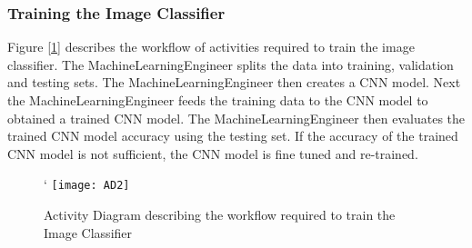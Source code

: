 \subsubsection{Training the Image Classifier}

Figure [\ref{fig:AD2}] describes the workflow of activities required to train the image classifier. The MachineLearningEngineer splits the data into training, validation and testing sets. The MachineLearningEngineer then creates a CNN model. Next the MachineLearningEngineer feeds the training data to the CNN model to obtained a trained CNN model. The MachineLearningEngineer then evaluates the trained CNN model accuracy using the testing set. If the accuracy of the trained CNN model is not sufficient, the CNN model is fine tuned and re-trained.

\begin{figure}[h]
\centering`
  \texttt{[image: AD2]}
\caption{Activity Diagram describing the workflow required to train the Image Classifier}
\label{fig:AD2}
\end{figure}

